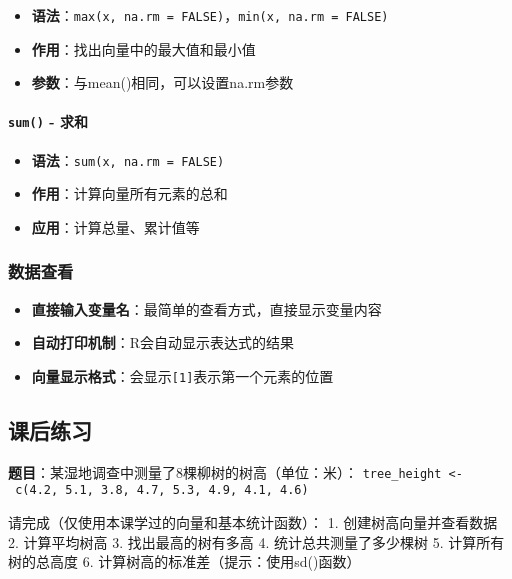 \documentclass[
]{book}
\providecommand{\tightlist}{%
  \setlength{\itemsep}{0pt}\setlength{\parskip}{0pt}}
\begin{document}
\begin{itemize}
\tightlist
\item
  \textbf{语法}：\texttt{max(x,\ na.rm\ =\ FALSE)}，\texttt{min(x,\ na.rm\ =\ FALSE)}
\item
  \textbf{作用}：找出向量中的最大值和最小值
\item
  \textbf{参数}：与mean()相同，可以设置na.rm参数
\end{itemize}

\hypertarget{sum---ux6c42ux548c}{%
\paragraph{\texorpdfstring{\texttt{sum()} - 求和}{sum() - 求和}}\label{sum---ux6c42ux548c}}

\begin{itemize}
\tightlist
\item
  \textbf{语法}：\texttt{sum(x,\ na.rm\ =\ FALSE)}
\item
  \textbf{作用}：计算向量所有元素的总和
\item
  \textbf{应用}：计算总量、累计值等
\end{itemize}

\hypertarget{ux6570ux636eux67e5ux770b}{%
\subsubsection{数据查看}\label{ux6570ux636eux67e5ux770b}}

\begin{itemize}
\tightlist
\item
  \textbf{直接输入变量名}：最简单的查看方式，直接显示变量内容
\item
  \textbf{自动打印机制}：R会自动显示表达式的结果
\item
  \textbf{向量显示格式}：会显示\texttt{{[}1{]}}表示第一个元素的位置
\end{itemize}

\hypertarget{ux8bfeux540eux7ec3ux4e60}{%
\subsection{课后练习}\label{ux8bfeux540eux7ec3ux4e60}}

\textbf{题目}：某湿地调查中测量了8棵柳树的树高（单位：米）：
\texttt{tree\_height\ \textless{}-\ c(4.2,\ 5.1,\ 3.8,\ 4.7,\ 5.3,\ 4.9,\ 4.1,\ 4.6)}

请完成（仅使用本课学过的向量和基本统计函数）：
1. 创建树高向量并查看数据
2. 计算平均树高
3. 找出最高的树有多高
4. 统计总共测量了多少棵树
5. 计算所有树的总高度
6. 计算树高的标准差（提示：使用sd()函数）
\end{document}
